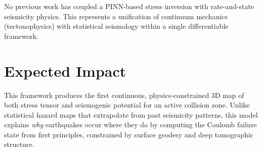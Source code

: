 \documentclass[11pt, a4paper]{article}
\begin{document}
No previous work has coupled a PINN-based stress inversion with rate-and-state seismicity physics. This represents a unification of continuum mechanics (tectonophysics) with statistical seismology within a single differentiable framework.

\section{Expected Impact}

This framework produces the first continuous, physics-constrained 3D map of both stress tensor and seismogenic potential for an active collision zone. Unlike statistical hazard maps that extrapolate from past seismicity patterns, this model explains \textit{why} earthquakes occur where they do by computing the Coulomb failure state from first principles, constrained by surface geodesy and deep tomographic structure.
\end{document}
